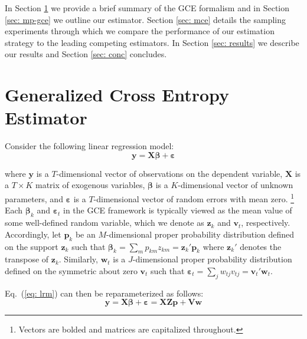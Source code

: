 \documentclass{elsarticle}
\begin{document}
In Section \ref{sec: gce} we provide a brief summary of the GCE formalism and 
in Section \ref{sec: mp-gce} we outline our estimator. 
Section \ref{sec: mce} details the sampling experiments through which we 
compare the performance of our estimation strategy to the leading competing 
estimators. 
In Section \ref{sec: results} we describe our results and Section \ref{sec: conc}
concludes.


\section{Generalized Cross Entropy Estimator}
\label{sec: gce}

Consider the following linear regression model: 
\begin{equation}
\mathbf{y} = \mathbf{X\beta} + \mathbf{\varepsilon}
\label{eq: lrm}
\end{equation}

\noindent
where $\mathbf{y}$ is a $T$-dimensional vector of observations on the 
dependent variable, $\mathbf{X}$ is a $T\times K$ matrix of exogenous
variables, $\mathbf{\beta}$ is a $K$-dimensional vector of unknown 
parameters, and $\mathbf{\varepsilon}$ is a $T$-dimensional vector of 
random errors with mean zero.%
\footnote{Vectors are bolded and matrices are capitalized throughout.}
Each $\mathbf{\beta}_k$ and $\mathbf{\varepsilon}_t$ in the GCE 
framework is typically viewed as the mean value of some well-defined 
random variable, which we denote as $\mathbf{z}_k$ and $\mathbf{v}_t$, 
respectively.
Accordingly, let $\mathbf{p}_k$ be an $M$-dimensional proper 
probability distribution defined on the support $\mathbf{z}_k$ such that 
$\mathbf{\beta}_k = \sum_m p_{km}z_{km} = \mathbf{z}_k' 
\mathbf{p}_k$ where $\mathbf{z}_k'$ denotes the transpose of $\mathbf{z}_k$.
Similarly, $\mathbf{w}_t$ is a $J$-dimensional proper probability distribution defined on 
the symmetric about zero $\mathbf{v}_t$ such that $\mathbf{\varepsilon}_t = 
\sum_j w_{tj}v_{tj} = \mathbf{v}_t' \mathbf{w}_t$.

Eq.\ (\ref{eq: lrm}) can then be reparameterized as follows:
\begin{equation}
\mathbf{y} = \mathbf{X\beta} + \mathbf{\varepsilon} = 
\mathbf{X Z p} + \mathbf{V w}
\label{eq: reparm}
\end{equation}
\end{document}
